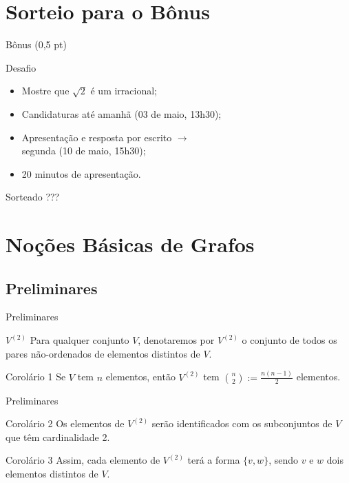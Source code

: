 \documentclass[xcolor=dvipsnames,table]{beamer}
\begin{document}
    \section{Sorteio para o Bônus}
    \begin{frame}{Bônus (0,5 pt)}
		\begin{block}{Desafio}
			\begin{itemize}
				\item Mostre que $\sqrt{2}$ é um irracional;
                \item Candidaturas até amanhã (03 de maio, 13h30);
                \item Apresentação e resposta por escrito $\rightarrow$ \\segunda (10 de maio, 15h30);
                \item 20 minutos de apresentação.
			\end{itemize}
		\end{block}
        \begin{block}{Sorteado}
			???
		\end{block}	
	\end{frame}
	
	\section{Noções Básicas de Grafos}	
	\subsection{Preliminares}
	\begin{frame}{Preliminares}
		\begin{block}{$V^{(2)}$}
			Para qualquer conjunto $V$, denotaremos por $V^{(2)}$ o conjunto de todos os pares não-ordenados de elementos distintos de $V$.
		\end{block}
		\pause
		\begin{block}{Corolário 1}
			Se $V$ tem $n$ elementos, então $V^{(2)}$ tem ${n \choose 2} := \frac{n(n-1)}{2}$ elementos.
		\end{block}
	\end{frame}
	
	\begin{frame}{Preliminares}
		\begin{block}{Corolário 2}
			Os elementos de $V^{(2)}$ serão identificados com os subconjuntos de $V$ que têm cardinalidade 2.
		\end{block}
		\pause
		\begin{block}{Corolário 3}
			Assim, cada elemento de $V^{(2)}$ terá a forma $\{ v,w \}$, sendo $v$ e $w$ dois elementos distintos de $V$.
		\end{block}
	\end{frame}
	
\end{document}
